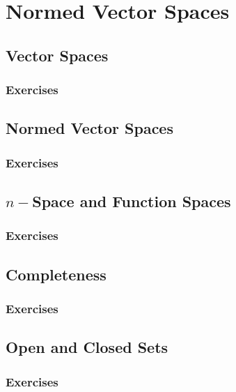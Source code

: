 \setcounter{chapter}{0}
\renewcommand{\thechapter}{6}
\chapter{Normed Vector Spaces}\label{ch:6}
\setcounter{equation}{0}	        %

\section{Vector Spaces}\label{sec:6.1}
\subsection*{Exercises}\label{sec:6.1_Exercises}
\section{Normed Vector Spaces}\label{sec:6.2}	
\subsection*{Exercises}\label{sec:6.2_Exercises}
\section{$n-$Space and Function Spaces}\label{sec:6.3}	
\subsection*{Exercises}\label{sec:6.3_Exercises}
\section{Completeness}\label{sec:6.4}	
\subsection*{Exercises}\label{sec:6.4_Exercises}
\section{Open and Closed Sets}\label{sec:6.5}	
\subsection*{Exercises}\label{sec:6.5_Exercises}

